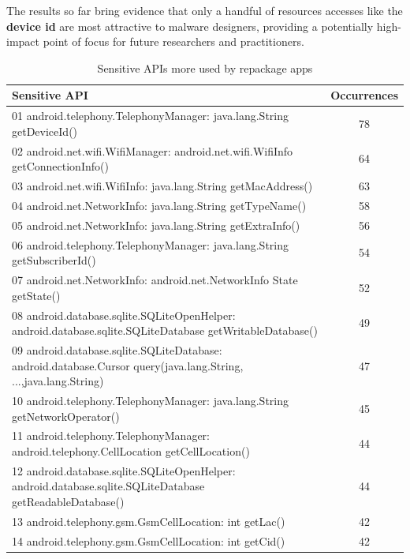 \begin{obs}{5}{}
  The results so far bring evidence that only a handful of resources accesses like the \textbf{device id} are most attractive to malware designers, providing a potentially high-impact point of focus for future researchers and practitioners.
\end{obs}

\begin{table}[t]
 \scriptsize
  \caption{Sensitive APIs more used by repackage apps}
  \centering
 \begin{tabular}{lc}

   \toprule
   Sensitive API & Occurrences \\
   \midrule
   01 android.telephony.TelephonyManager: java.lang.String getDeviceId() &  78 \\
   02 android.net.wifi.WifiManager: android.net.wifi.WifiInfo getConnectionInfo() &  64\\
   03 android.net.wifi.WifiInfo: java.lang.String getMacAddress() &  63 \\
   04 android.net.NetworkInfo: java.lang.String getTypeName() &  58 \\
   05 android.net.NetworkInfo: java.lang.String getExtraInfo() &  56 \\
   06 android.telephony.TelephonyManager: java.lang.String getSubscriberId() &  54 \\
   07 android.net.NetworkInfo: android.net.NetworkInfo State getState() &  52 \\
   08 android.database.sqlite.SQLiteOpenHelper: android.database.sqlite.SQLiteDatabase getWritableDatabase() &  49 \\
   09 android.database.sqlite.SQLiteDatabase: android.database.Cursor query(java.lang.String, ...,java.lang.String) &  47 \\
   10 android.telephony.TelephonyManager: java.lang.String getNetworkOperator() &  45\\
   11 android.telephony.TelephonyManager: android.telephony.CellLocation getCellLocation() &  44\\
   12 android.database.sqlite.SQLiteOpenHelper: android.database.sqlite.SQLiteDatabase getReadableDatabase() &  44\\
   13 android.telephony.gsm.GsmCellLocation: int getLac() &  42 \\
   14 android.telephony.gsm.GsmCellLocation: int getCid() &  42 \\
   

\end{tabular}
\end{table}
